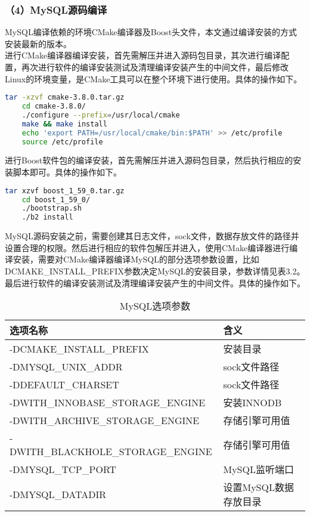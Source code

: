 	\subsubsection{（4）MySQL源码编译}
	MySQL编译依赖的环境CMake编译器及Boost头文件，本文通过编译安装的方式安装最新的版本。\\
	\indent 进行CMake编译器编译安装，首先需解压并进入源码包目录，其次进行编译配置，再次进行软件的编译安装测试及清理编译安装产生的中间文件，最后修改Linux的环境变量，是CMake工具可以在整个环境下进行使用。具体的操作如下。\\
	\begin{lstlisting}[language=bash]
	tar -xzvf cmake-3.8.0.tar.gz
	cd cmake-3.8.0/
	./configure --prefix=/usr/local/cmake
	make && make install
	echo 'export PATH=/usr/local/cmake/bin:$PATH' >> /etc/profile
	source /etc/profile
	\end{lstlisting}
	\indent 进行Boost软件包的编译安装，首先需解压并进入源码包目录，然后执行相应的安装脚本即可。具体的操作如下。\\
	\begin{lstlisting}[language=bash]
	tar xzvf boost_1_59_0.tar.gz
	cd boost_1_59_0/
	./bootstrap.sh
	./b2 install
	\end{lstlisting}
	\indent MySQL源码安装之前，需要创建其日志文件，sock文件，数据存放文件的路径并设置合理的权限。然后进行相应的软件包解压并进入，使用CMake编译器进行编译安装，需要对CMake编译器编译MySQL的部分选项参数设置，比如DCMAKE\_INSTALL\_PREFIX参数决定MySQL的安装目录，参数详情见表3.2。最后进行软件的编译安装测试及清理编译安装产生的中间文件。具体的操作如下。\\
	\begin{table}[!htbp]
		\centering
		\begin{tabular}{ll}	
			\toprule
			选项名称& 含义\\
			\midrule
			-DCMAKE\_INSTALL\_PREFIX&安装目录\\
			-DMYSQL\_UNIX\_ADDR&sock文件路径\\
			-DDEFAULT\_CHARSET&sock文件路径 \\
			-DWITH\_INNOBASE\_STORAGE\_ENGINE&安装INNODB\\
			-DWITH\_ARCHIVE\_STORAGE\_ENGINE&存储引擎可用值\\
			-DWITH\_BLACKHOLE\_STORAGE\_ENGINE&存储引擎可用值\\
			-DMYSQL\_TCP\_PORT&MySQL监听端口\\
			-DMYSQL\_DATADIR&设置MySQL数据存放目录\\
			\bottomrule
		\end{tabular}
		\caption{MySQL选项参数}
	\end{table} \\

